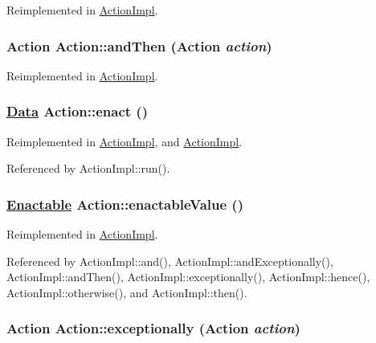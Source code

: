 Reimplemented in \hyperlink{classActionImpl_a16}{Action\-Impl}.\hypertarget{interfaceAction_a3}{
\subsubsection[andThen]{\setlength{\rightskip}{0pt plus 5cm}Action Action::and\-Then (Action {\em action})}}
\label{interfaceAction_a3}




Reimplemented in \hyperlink{classActionImpl_a13}{Action\-Impl}.\hypertarget{interfaceAction_a1}{
\subsubsection[enact]{\setlength{\rightskip}{0pt plus 5cm}\hyperlink{interfaceData}{Data} Action::enact ()}}
\label{interfaceAction_a1}




Reimplemented in \hyperlink{classActionImpl_a1}{Action\-Impl}, and \hyperlink{classActionImpl_a11}{Action\-Impl}.

Referenced by Action\-Impl::run().

\hypertarget{interfaceAction_a0}{
\subsubsection[enactableValue]{\setlength{\rightskip}{0pt plus 5cm}\hyperlink{interfaceEnactable}{Enactable} Action::enactable\-Value ()}}
\label{interfaceAction_a0}




Reimplemented in \hyperlink{classActionImpl_a10}{Action\-Impl}.

Referenced by Action\-Impl::and(), Action\-Impl::and\-Exceptionally(), Action\-Impl::and\-Then(), Action\-Impl::exceptionally(), Action\-Impl::hence(), Action\-Impl::otherwise(), and Action\-Impl::then().

\hypertarget{interfaceAction_a5}{
\subsubsection[exceptionally]{\setlength{\rightskip}{0pt plus 5cm}Action Action::exceptionally (Action {\em action})}}
\label{interfaceAction_a5}




